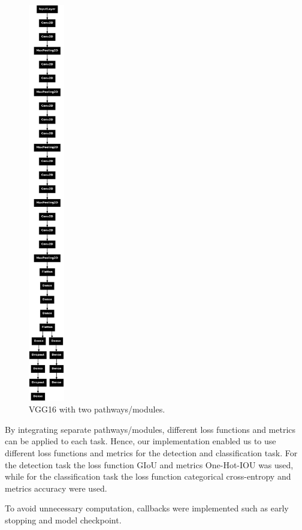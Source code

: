 \documentclass[12pt]{article}
\begin{document}
\begin{figure}[h]
    \centering
    \includegraphics[width=0.14\textwidth]{./graphics/3.png}
    \caption{VGG16 with two pathways/modules.}
\end{figure}

By integrating separate pathways/modules, different loss functions and metrics can be applied to each task. Hence, our implementation enabled us to use different loss functions and metrics for the detection and classification task. 
For the detection task the loss function GIoU and metrics One-Hot-IOU was used, while for the classification task the loss function categorical cross-entropy and metrics accuracy were used.

To avoid unnecessary computation, callbacks were implemented such as early stopping and model checkpoint. 
\end{document}
